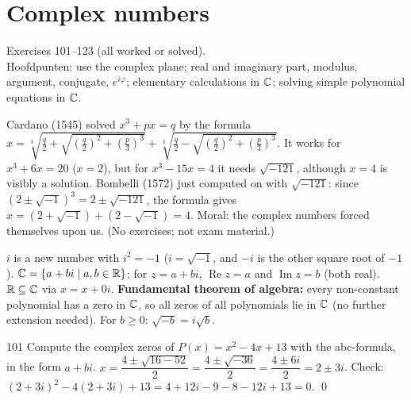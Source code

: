 \chapter{Complex numbers}
%
{Exercises 101--123 (all worked or solved).\\ Hoofdpunten: use the complex plane; real and imaginary part, modulus, argument, conjugate, $e^{i\varphi}$; elementary calculations in $\mathbb{C}$; solving simple polynomial equations in $\mathbb{C}$.}

\begin{key}
Cardano (1545) solved $x^3+px=q$ by the formula $x=\sqrt[3]{\frac q2+\sqrt{(\frac q2)^2+(\frac p3)^3}}+\sqrt[3]{\frac q2-\sqrt{(\frac q2)^2+(\frac p3)^3}}$. It works for $x^3+6x=20$ ($x=2$), but for $x^3-15x=4$ it needs $\sqrt{-121}$, although $x=4$ is visibly a solution. Bombelli (1572) just computed on with $\sqrt{-121}$: since $(2\pm\sqrt{-1})^3=2\pm\sqrt{-121}$, the formula gives $x=(2+\sqrt{-1})+(2-\sqrt{-1})=4$. Moral: the complex numbers forced themselves upon us. (No exercises; not exam material.)
\end{key}

\begin{key}
$i$ is a new number with $i^2=-1$ ($i=\sqrt{-1}$, and $-i$ is the other square root of $-1$). $\mathbb{C}=\{a+bi\mid a,b\in\mathbb{R}\}$; for $z=a+bi$, $\operatorname{Re}z=a$ and $\operatorname{Im}z=b$ (both real). $\mathbb{R}\subseteq\mathbb{C}$ via $x=x+0i$. \textbf{Fundamental theorem of algebra:} every non-constant polynomial has a zero in $\mathbb{C}$, so all zeros of all polynomials lie in $\mathbb{C}$ (no further extension needed). For $b\ge0$: $\sqrt{-b}=i\sqrt b$.
\end{key}

\begin{bookex}{101}
Compute the complex zeros of $P(x)=x^2-4x+13$ with the abc-formula, in the form $a+bi$.
\solution
$x=\dfrac{4\pm\sqrt{16-52}}2=\dfrac{4\pm\sqrt{-36}}2=\dfrac{4\pm6i}2=2\pm3i$. Check: $(2+3i)^2-4(2+3i)+13=4+12i-9-8-12i+13=0$. \checkmark\qed
\end{bookex}

